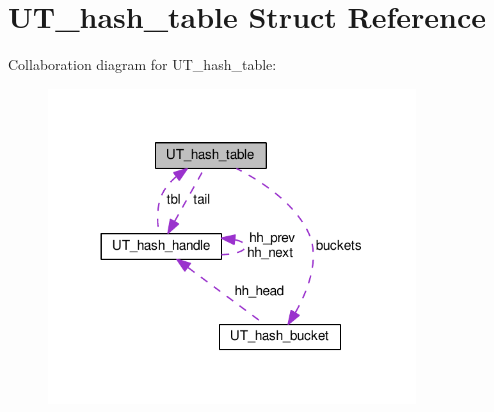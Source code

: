 \hypertarget{struct_u_t__hash__table}{\section{U\+T\+\_\+hash\+\_\+table Struct Reference}
\label{struct_u_t__hash__table}
}


Collaboration diagram for U\+T\+\_\+hash\+\_\+table\+:\nopagebreak
\begin{figure}[H]
\begin{center}
\leavevmode
\includegraphics[width=276pt]{struct_u_t__hash__table__coll__graph}
\end{center}
\end{figure}

